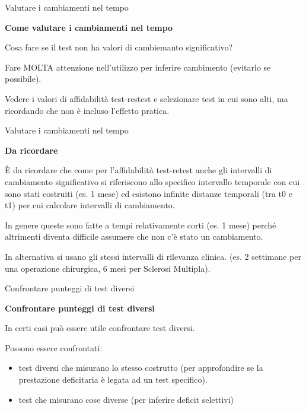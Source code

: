 \documentclass[
  ignorenonframetext,
]{beamer}
\begin{document}
\begin{frame}{Valutare i cambiamenti nel tempo}
\label{valutare-i-cambiamenti-nel-tempo-15}
\begin{center}
\textbf{Come valutare i cambiamenti nel tempo}
\end{center}
\vspace{2em}

Cosa fare se il test non ha valori di cambiemanto significativo?

Fare MOLTA attenzione nell'utilizzo per inferire cambimento (evitarlo se
possibile).

Vedere i valori di affidabilità test-restest e selezionare test in cui
sono alti, ma ricordando che non è incluso l'effetto pratica.
\end{frame}

\begin{frame}{Valutare i cambiamenti nel tempo}
\label{valutare-i-cambiamenti-nel-tempo-16}
\begin{center}
\textbf{Da ricordare}
\end{center}
\vspace{1em}

È da ricordare che come per l'affidabilità test-retest anche gli
intervalli di cambiamento significativo si riferiscono allo specifico
intervallo temporale con cui sono stati costruiti (es. 1 mese) ed
esistono infinite distanze temporali (tra t0 e t1) per cui calcolare
intervalli di cambiamento.

In genere queste sono fatte a tempi relativamente corti (es. 1 mese)
perché altrimenti diventa difficile assumere che non c'è stato un
cambiamento.

In alternativa si usano gli stessi intervalli di rilevanza clinica. (es.
2 settimane per una operazione chirurgica, 6 mesi per Sclerosi
Multipla).
\end{frame}

\begin{frame}{Confrontare punteggi di test diversi}
\label{confrontare-punteggi-di-test-diversi}
\begin{center}
  \textbf{Confrontare punteggi di test diversi}
\end{center}
\vspace{2em}

In certi casi può essere utile confrontare test diversi.

Possono essere confrontati:

\begin{itemize}
\item
  test diversi che misurano lo stesso costrutto (per approfondire se la
  prestazione deficitaria è legata ad un test specifico).
\item
  test che misurano cose diverse (per inferire deficit selettivi)
\end{itemize}
\end{frame}
\end{document}
